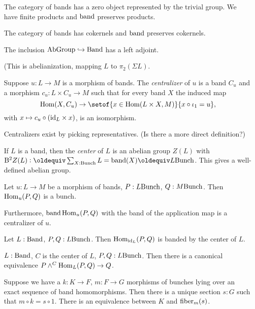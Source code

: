 The category of bands has a zero object represented by the trivial
group. We have finite products and $\operatorname{band}$ preserves products.

\begin{lemma}
  The category of bands has cokernels and $\operatorname{band}$ preserves cokernels.
\end{lemma}
\begin{lemma}
  The inclusion $\mathord{\mathrm{AbGroup}} \hookrightarrow \mathord{\mathrm{Band}}$ has a left adjoint.
\end{lemma}
(This is abelianization, mapping $L$ to $\pi_2(\Sigma L)$.

\begin{definition}
  Suppose $u : L \to M$ is a morphism of bands. The \emph{centralizer}
  of $u$ is a band $C_u$ and a morphism $c_u : L \times C_u \to M$
  such that for every band $X$ the induced map
  \[
    \Hom(X,C_u) \to \setof{x \in \Hom(L \times X,
      M)}{x\circ\iota_1=u},
  \]
  with $x \mapsto c_u \circ (\mathord{\mathrm{id}}_L\times x)$, is an isomorphism.
\end{definition}
Centralizers exist by picking representatives. (Is there a more direct
definition?)

If $L$ is a band, then the \emph{center} of $L$ is an abelian group
$Z(L)$ with $\B^2Z(L) \defeq \sum_{X : \Bunch} L=\band(X) \jdeq
L\Bunch$. This gives a well-defined abelian group.

\begin{theorem}
  Let $u : L\to M$ be a morphism of bands, $P:L\mathord{\mathrm{Bunch}}$, $Q:M\mathord{\mathrm{Bunch}}$.
  Then $\mathrm{Hom}_u(P,Q)$ is a bunch.

  Furthermore, $\operatorname{band}\mathrm{Hom}_u(P,Q)$ with the band of the application map
  is a centralizer of $u$.
\end{theorem}
\begin{lemma}
  Let $L:\mathord{\mathrm{Band}}$, $P,Q:L\mathord{\mathrm{Bunch}}$. Then $\mathrm{Hom}_{\mathord{\mathrm{id}}_L}(P,Q)$ is banded by
  the center of $L$.
\end{lemma}

\begin{lemma}
  $L:\mathord{\mathrm{Band}}$, $C$ is the center of $L$, $P,Q:L\mathord{\mathrm{Bunch}}$. Then there is a
  canonical equivalence $P \wedge^C \mathrm{Hom}_L(P,Q) \to Q$.
\end{lemma}

\begin{lemma}
  Suppose we have a $k : K\to F$, $m:F\to G$ morphisms of bunches lying
  over an exact sequence of band homomorphisms. Then there is a unique
  section $s : G$ such that $m\circ k=s\circ 1$. There is an
  equivalence between $K$ and $\operatorname{fiber}_m(s)$.
\end{lemma}

